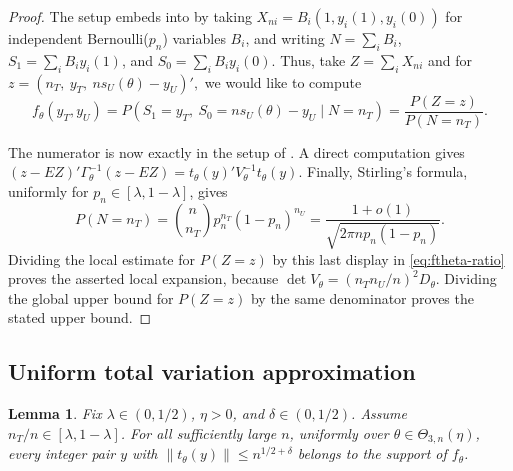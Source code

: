 \documentclass[12pt,reqno]{amsart}
\theoremstyle{theorem}
\newtheorem{lem}{Lemma}[section]
\theoremstyle{definition}
\newcommand{\0}{\mathbf{0}}
\newcommand{\1}{\mathbf{1}}
\begin{document}
\begin{proof}
The setup embeds into  by taking $X_{ni} = B_i (1,y_i(1),y_i(0))$ for independent Bernoulli($p_n$) variables $B_i$, and writing $N = \sum_i B_i$, $S_1 = \sum_i B_i y_i(1)$, and $S_0 = \sum_i B_i y_i(0)$.
Thus, take $Z = \sum_i X_{ni}$ and for
$
z=(n_T,\ y_T,\ ns_U(\theta)-y_U)',
$ we would like to compute
\begin{equation}\label{eq:ftheta-ratio}
f_\theta(y_T,y_U)
=
P(S_1=y_T,\ S_0=ns_U(\theta)-y_U\mid N=n_T)
=
\frac{P(Z=z)}{P(N=n_T)}.
\end{equation}

The numerator is now exactly in the setup of .
A direct computation gives
\(
(z-E Z)'\Gamma_\theta^{-1}(z-E Z)
=t_\theta(y)'V_\theta^{-1}t_\theta(y).
\)
Finally, Stirling's formula, uniformly for \(p_n\in[\lambda,1-\lambda]\), gives
\[
P(N=n_T)
=
\binom{n}{n_T}p_n^{n_T}(1-p_n)^{n_U}
=
\frac{1+o(1)}{\sqrt{2\pi np_n(1-p_n)}}.
\]
Dividing the local estimate for \(P(Z=z)\) by this last display in
\eqref{eq:ftheta-ratio} proves the asserted local expansion, because
\(\det V_\theta=(n_Tn_U/n)^2D_\theta\).  Dividing the global upper bound for
\(P(Z=z)\) by the same denominator proves the stated upper bound.
\end{proof}

\subsection{Uniform total variation approximation}
\label{sec:tv}

\begin{lem}
\label{lem:central-support}
Fix \(\lambda\in(0,1/2)\), \(\eta>0\), and \(\delta\in(0,1/2)\).  Assume
\(n_T/n\in[\lambda,1-\lambda]\).  For all sufficiently large \(n\), uniformly
over \(\theta\in\Theta_{3,n}(\eta)\), every integer pair \(y\) with
$
\|t_\theta(y)\|\le n^{1/2+\delta}
$
belongs to the support of \(f_\theta\).
\end{lem}
\end{document}
